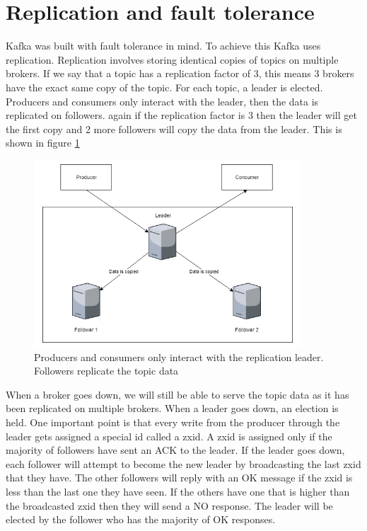 \section{Replication and fault tolerance}

Kafka was built with fault tolerance in mind. To achieve this Kafka uses replication. Replication involves storing identical copies of topics on multiple brokers. If we say that a topic has a replication factor of 3, this means 3 brokers have the exact same copy of the topic. For each topic, a leader is elected. Producers and consumers only interact with the leader, then the data is replicated on followers. again if the replication factor is 3 then the leader will get the first copy and 2 more followers will copy the data from the leader. This is shown in figure \ref{fig:replication-leader}

\begin{figure}[H]
  \centering
  \includegraphics[scale=0.5,width=100mm]{./images/replication-leader.png}
  \caption{Producers and consumers only interact with the replication leader. Followers replicate the topic data}
  \label{fig:replication-leader}
\end{figure}

When a broker goes down, we will still be able to serve the topic data as it has been replicated on multiple brokers. When a leader goes down, an election is held. One important point is that every write from the producer through the leader gets assigned a special id called a zxid. A zxid is assigned only if the majority of followers have sent an ACK to the leader. If the leader goes down, each follower will attempt to become the new leader by broadcasting the last zxid that they have. The other followers will reply with an OK message if the zxid is less than the last one they have seen. If the others have one that is higher than the broadcasted zxid then they will send a NO response. The leader will be elected by the follower who has the majority of OK responses. 